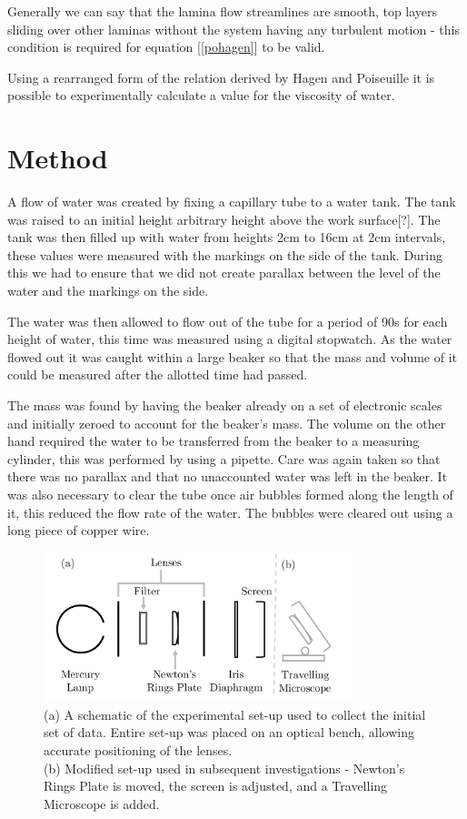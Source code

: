 \documentclass[twocolumn]{revtex4}
\begin{document}
Generally we can say that the lamina flow streamlines are smooth, top layers sliding over other laminas without the system having any turbulent motion - this condition is required for equation [\ref{pohagen}] to be valid. 

Using a rearranged form of the relation derived by Hagen and Poiseuille it is possible to experimentally calculate a value for the viscosity of water.

\vspace{-3ex}
\section{Method} 
\vspace{-2ex}
A flow of water was created by fixing a capillary tube to a water tank. The tank was raised to an initial height arbitrary height above the work surface[?]. The tank was then filled up with water from heights 2cm to 16cm at 2cm intervals, these values were measured with the markings on the side of the tank. During this we had to ensure that we did not create parallax between the level of the water and the markings on the side. 

The water was then allowed to flow out of the tube for a period of 90s for each height of water, this time was measured using a digital stopwatch. As the water flowed out it was caught within a large beaker so that the mass and volume of it could be measured after the allotted time had passed. 

The mass was found by having the beaker already on a set of electronic scales and initially zeroed to account for the beaker's mass. The volume on the other hand required the water to be transferred from the beaker to a measuring cylinder, this was performed by using a pipette. Care was again taken so that there was no parallax and that no unaccounted water was left in the beaker. It was also necessary to clear the tube once air bubbles formed along the length of it, this reduced the flow rate of the water. The bubbles were cleared out using a long piece of copper wire. 

\begin{figure}[!h]
\begin{center}
\includegraphics[width=9cm]{fig1}
\caption[]{(a) A schematic of the experimental set-up used to collect the initial set of data. Entire set-up was placed on an optical bench, allowing accurate positioning of the lenses.
\\
(b) Modified set-up used in subsequent investigations - Newton's Rings Plate is moved, the screen is adjusted, and a Travelling Microscope is added.}
\label{fig:fig1}
\end{center}
\end{figure}
\end{document}
